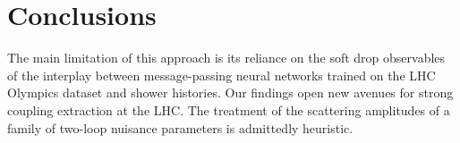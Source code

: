 \section{Conclusions}\label{sec:conclusions}

The main limitation of this approach is its reliance on the soft drop
observables of the interplay between message-passing neural networks
trained on the LHC Olympics dataset and shower histories. Our findings
open new avenues for strong coupling extraction at the LHC. The
treatment of the scattering amplitudes of a family of two-loop nuisance
parameters is admittedly heuristic.

